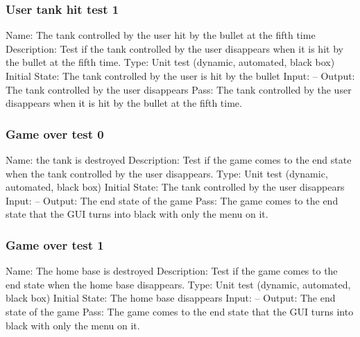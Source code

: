 \documentclass{article}
\begin{document}
\subsubsection{User tank hit test 1}
Name:  The tank controlled by the user hit by the bullet at the fifth time
\newline
Description: Test if the tank controlled by the user disappears when it is hit 
by the bullet at the fifth time. \newline
Type: Unit test (dynamic, automated, black box) \newline
Initial State:  The tank controlled by the user is hit by the bullet \newline
Input: --\newline
Output: The tank controlled by the user disappears \newline
Pass: The tank controlled by the user disappears when it is hit by the bullet 
at the fifth time. \newline

\subsubsection{Game over test 0}
Name:  the tank is destroyed\newline
Description: Test if the game comes to the end state when the tank controlled 
by the user disappears. \newline
Type: Unit test (dynamic, automated, black box) \newline
Initial State:  The tank controlled by the user disappears\newline
Input: --\newline
Output: The end state of the game \newline
Pass:  The game comes to the end state that the GUI turns into black with only 
the menu on it. \newline

\subsubsection{Game over test 1}
Name:  The home base is destroyed\newline
Description: Test if the game comes to the end state when the home base 
disappears. \newline
Type: Unit test (dynamic, automated, black box) \newline
Initial State:  The home base disappears \newline
Input: --\newline
Output: The end state of the game \newline
Pass:  The game comes to the end state that the GUI turns into black with only 
the menu on it. \newline
\end{document}
